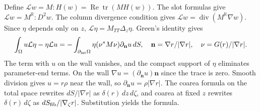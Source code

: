 Define $\mathcal Lw=M:H(w)=\operatorname{Re}\operatorname{tr}(MH(w))$. The slot formulas give $\mathcal Lw=M^\mathbb R:D^2w$. The column divergence condition gives $\mathcal Lw=\operatorname{div}(M^\mathbb R\nabla w)$. Since $\eta$ depends only on $z$, $\mathcal L\eta=M_{TT}\Delta_z\eta$. Green's identity gives
\[
\int_\Omega u\mathcal L\eta-\eta\mathcal Lu
=-\int_{\partial_{\rm lat}\Omega}\eta(\nu^*M\nu)\partial_{\mathbf n}u\,dS,
\quad
\mathbf n=\nabla r/|\nabla r|,\quad \nu=G(r)/|\nabla r|.
\]
The term with $u$ on the wall vanishes, and the compact support of $\eta$ eliminates parameter-end terms. On the wall $\nabla u=(\partial_{\mathbf n}u)\mathbf n$ since the trace is zero. Smooth division gives $u=r\rho$ near the wall, so $\partial_{\mathbf n}u=\rho|\nabla r|$. The coarea formula on the total space rewrites $dS/|\nabla r|$ as $\delta(r)\,dz\,d\zeta$, and coarea at fixed $z$ rewrites $\delta(r)\,d\zeta$ as $dS_{\rm fib}/|\nabla_\zeta r|$. Substitution yields the formula.
